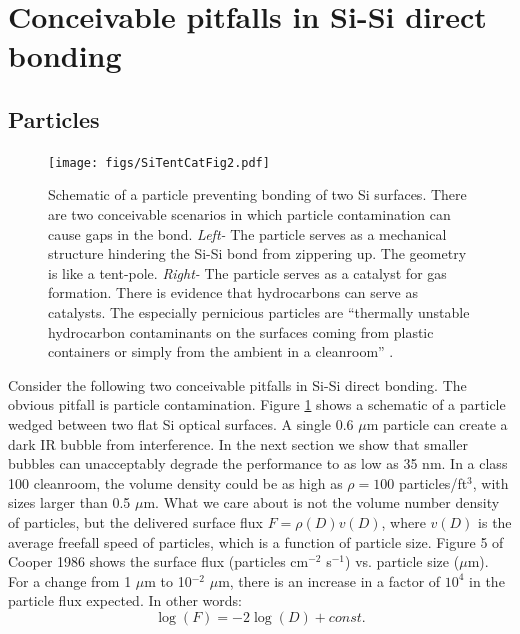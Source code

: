 \documentclass[osajnl,preprint,showpacs,superscriptaddress,12pt]{revtex4-1} %
\begin{document}
\section{Conceivable pitfalls in Si-Si direct bonding}

\subsection{Particles}

\begin{figure}[htbp]
\centerline{\texttt{[image: figs/SiTentCatFig2.pdf]}}
\caption{Schematic of a particle preventing bonding of two Si surfaces\label{figParticle}.  There are two conceivable scenarios in which particle contamination can cause gaps in the bond.  \emph{Left-} The particle serves as a mechanical structure hindering the Si-Si bond from zippering up.  The geometry is like a tent-pole.  \emph{Right-} The particle serves as a catalyst for gas formation.  There is evidence that hydrocarbons can serve as catalysts.  The especially pernicious particles are ``thermally unstable hydrocarbon contaminants on the surfaces coming from plastic containers or simply from the ambient in a cleanroom'' \cite{1998AnRMS..28..215G}. }
\end{figure}

Consider the following two conceivable pitfalls in Si-Si direct bonding.  The obvious pitfall is particle contamination.  Figure \ref{figParticle} shows a schematic of a particle wedged between two flat Si optical surfaces.  A single 0.6 $\mu$m particle can create a dark IR bubble from interference.  In the next section we show that smaller bubbles can unacceptably degrade the performance to as low as 35 nm.  In a class 100 cleanroom, the volume density could be as high as $\rho=100$ particles/ft$^3$, with sizes larger than 0.5 $\mu$m.  What we care about is not the volume number density of particles, but the delivered surface flux $F=\rho(D) v(D)$, where $v(D)$ is the average freefall speed of particles, which is a function of particle size.  Figure 5 of Cooper 1986\cite{doi:10.1080/02786828608959094} shows the surface flux (particles cm$^{-2}$ s$^{-1}$) vs. particle size ($\mu$m).  For a change from 1 $\mu$m to 10$^{-2}$ $\mu$m, there is an increase in a factor of $10^4$ in the particle flux expected.  In other words:
$$\log(F) = -2\log(D) + const.$$
\end{document}
